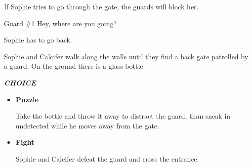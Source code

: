 If Sophie tries to go through the gate, the guards will block her.

\begin{screenplay}

\begin{dialogue}{Guard \#{}1}
Hey, where are you going?
\end{dialogue}

Sophie has to go back.

\end{screenplay}
\vspace{1em}


%
%

Sophie and Calcifer walk along the walls until they find a back gate patrolled by a guard. On the ground there is a glass bottle.

%
%
%
%
%

\textit{\textbf{CHOICE}}
\begin{itemize}
  \item \textbf{Puzzle}
  
%  
%  
%

  Take the bottle and throw it away to distract the guard, than sneak in undetected while he moves away from the gate.

  \item \textbf{Fight}
    
  Sophie and Calcifer defeat the guard and cross the entrance.
\end{itemize}

